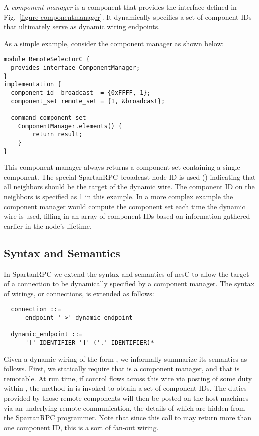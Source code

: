 A \emph{component manager} is a component that provides the  interface
defined in Fig.~\ref{figure-componentmanager}. It dynamically specifies a set of component IDs
that ultimately serve as dynamic wiring endpoints.

As a simple example, consider the component manager  as shown below:
\begin{Verbatim}
module RemoteSelectorC {
  provides interface ComponentManager;
}
implementation {
  component_id  broadcast  = {0xFFFF, 1};
  component_set remote_set = {1, &broadcast};

  command component_set
    ComponentManager.elements() {
        return result;
    }
}
\end{Verbatim}

This component manager always returns a component set containing a single component. The special
SpartanRPC broadcast node ID is used () indicating that all neighbors should be the
target of the dynamic wire. The component ID on the neighbors is specified as 1 in this example.
In a more complex example the component manager would compute the component set each time the
dynamic wire is used, filling in an array of component IDs based on information gathered earlier
in the node's lifetime.

\subsection{Syntax and Semantics}

In SpartanRPC we extend the syntax and semantics of nesC to allow the target of a connection to
be dynamically specified by a component manager. The syntax of wirings, or connections, is
extended as follows:
\begin{Verbatim}
  connection ::=
      endpoint '->' dynamic_endpoint

  dynamic_endpoint ::=
      '[' IDENTIFIER ']' ('.' IDENTIFIER)*
\end{Verbatim}
\vspace{0.4em}

Given a dynamic wiring of the form , we informally summarize its semantics as
follows. First, we statically require that  is a component manager, and that  is
remotable. At run time, if control flows across this wire via posting of some duty 
within , the method  in  is invoked to obtain a set of component
IDs. The duties  provided by those remote components will then be posted on the host
machines via an underlying remote communication, the details of which are hidden from the
SpartanRPC programmer. Note that since this call to  may return more than one
component ID, this is a sort of fan-out wiring.

